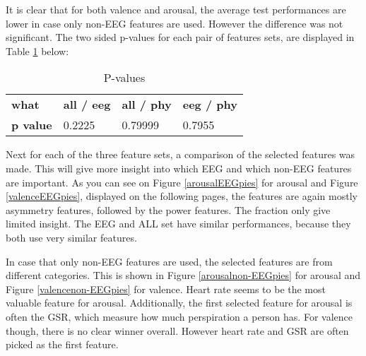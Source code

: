 It is clear that for both valence and arousal, the average test performances are lower in case only non-EEG features are used. However the difference was not significant. The two sided p-values for each pair of features sets, are displayed in Table \ref{pvals} below:

\begin{table}[H]
\centering
\begin{tabular}{l|lll}
\textbf{what}    & \textbf{all / eeg} & \textbf{all / phy} & \textbf{eeg / phy} \\
\textbf{p value} & 0.2225             & 0.79999            & 0.7955            
\end{tabular}
\caption{P-values\label{pvals}}
\end{table}
\clearpage

Next for each of the three feature sets, a comparison of the selected features was made. This will give more insight into which EEG and which non-EEG features are important. As you can see on Figure \ref{arousalEEGpies} for arousal and Figure \ref{valenceEEGpies}, displayed on the following pages, the features are again mostly asymmetry features, followed by the power features. The fraction only give limited insight. The EEG and ALL set have similar performances, because they both use very similar features.

\npar

In case that only non-EEG features are used, the selected features are from different categories. This is shown in Figure \ref{arousalnon-EEGpies} for arousal and Figure \ref{valencenon-EEGpies} for valence. Heart rate seems to be the most valuable feature for arousal. Additionally, the first selected feature for arousal is often the GSR, which measure how much perspiration a person has.
For valence though, there is no clear winner overall. However heart rate and GSR are often picked as the first feature.

